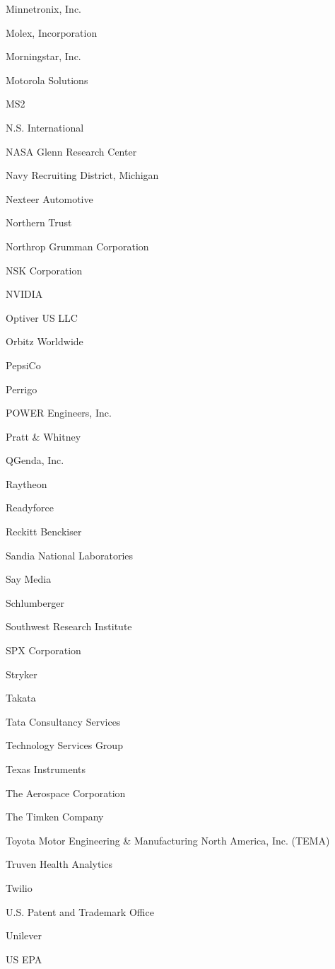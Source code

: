 \documentclass[twoside]{article}
\begin{document}
\begin{center}
\begin{multicols}{5}
\begin{FlushLeft}
\begin{compactitem}
\item Minnetronix, Inc.
\item Molex, Incorporation
\item Morningstar, Inc.
\item Motorola Solutions
\item MS2
\item N.S. International
\item NASA Glenn Research Center
\item Navy Recruiting District, Michigan
\item Nexteer Automotive
\item Northern Trust
\item Northrop Grumman Corporation
\item NSK Corporation
\item NVIDIA
\item Optiver US LLC
\item Orbitz Worldwide
\item PepsiCo
\item Perrigo
\item POWER Engineers, Inc.
\item Pratt \& Whitney
\item QGenda, Inc.
\item Raytheon
\item Readyforce
\item Reckitt Benckiser
\item Sandia National Laboratories
\item Say Media
\item Schlumberger
\item Southwest Research Institute
\item SPX Corporation
\item Stryker
\item Takata
\item Tata Consultancy Services
\item Technology Services Group
\item Texas Instruments
\item The Aerospace Corporation
\item The Timken Company
\item Toyota Motor Engineering \& Manufacturing North America, Inc. (TEMA)
\item Truven Health Analytics
\item Twilio
\item U.S. Patent and Trademark Office
\item Unilever
\item US EPA

\end{compactitem}
\end{FlushLeft}
\end{multicols}
\end{center}
\end{document}
